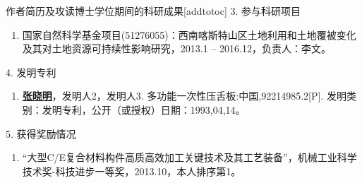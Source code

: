 \begin{personalcv}{作者简历及攻读博士学位期间的科研成果}[addtotoc]
3. 参与科研项目
\begin{enumerate}[nosep, label=$\lbrack$\arabic*$\rbrack$]
  \item{国家自然科学基金项目(51276055)：西南喀斯特山区土地利用和土地覆被变化及其对土地资源可持续性影响研究，2013.1 – 2016.12，负责人：李文。} %
\end{enumerate}{}\vspace{1em}

4. 发明专利
\begin{enumerate}[nosep, label=$\lbrack$\arabic*$\rbrack$]
  \item{\underline{\bf 张晓明}，发明人2，发明人3. 多功能一次性压舌板:中国,92214985.2[P]. 发明类别：发明专利，公开（或授权）日期：1993,04,14。} %
\end{enumerate}{}\vspace{1em}

5. 获得奖励情况
\begin{enumerate}[nosep, label=$\lbrack$\arabic*$\rbrack$]
  \item{“大型C/E复合材料构件高质高效加工关键技术及其工艺装备”，机械工业科学技术奖-科技进步一等奖，2013.10，本人排序第1。}
\end{enumerate}

\end{personalcv}



